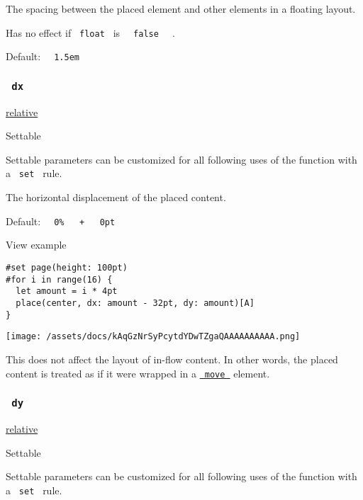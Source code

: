 The spacing between the placed element and other elements in a floating
layout.

Has no effect if \texttt{\ float\ } is
\texttt{\ }{\texttt{\ false\ }}\texttt{\ } .

Default: \texttt{\ }{\texttt{\ 1.5em\ }}\texttt{\ }

\subsubsection{\texorpdfstring{\texttt{\ dx\ }}{ dx }}\label{parameters-dx}

\href{/docs/reference/layout/relative/}{relative}

{{ Settable }}

\label{parameters-dx-settable-tooltip}
Settable parameters can be customized for all following uses of the
function with a \texttt{\ set\ } rule.

The horizontal displacement of the placed content.

Default:
\texttt{\ }{\texttt{\ 0\%\ }}\texttt{\ }{\texttt{\ +\ }}\texttt{\ }{\texttt{\ 0pt\ }}\texttt{\ }


View example

\begin{verbatim}
#set page(height: 100pt)
#for i in range(16) {
  let amount = i * 4pt
  place(center, dx: amount - 32pt, dy: amount)[A]
}
\end{verbatim}

\texttt{[image: /assets/docs/kAqGzNrSyPcytdYDwTZgaQAAAAAAAAAA.png]}

This does not affect the layout of in-flow content. In other words, the
placed content is treated as if it were wrapped in a
\href{/docs/reference/layout/move/}{\texttt{\ move\ }} element.

\subsubsection{\texorpdfstring{\texttt{\ dy\ }}{ dy }}\label{parameters-dy}

\href{/docs/reference/layout/relative/}{relative}

{{ Settable }}

\label{parameters-dy-settable-tooltip}
Settable parameters can be customized for all following uses of the
function with a \texttt{\ set\ } rule.

